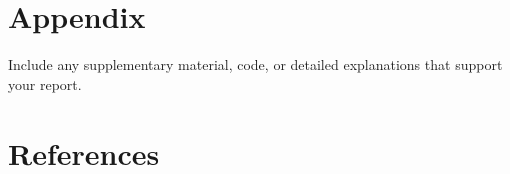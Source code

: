 \documentclass[12pt]{article}
\begin{document}
\appendix
\section{Appendix}
Include any supplementary material, code, or detailed explanations that support your report.

\section{References}


\end{document}
